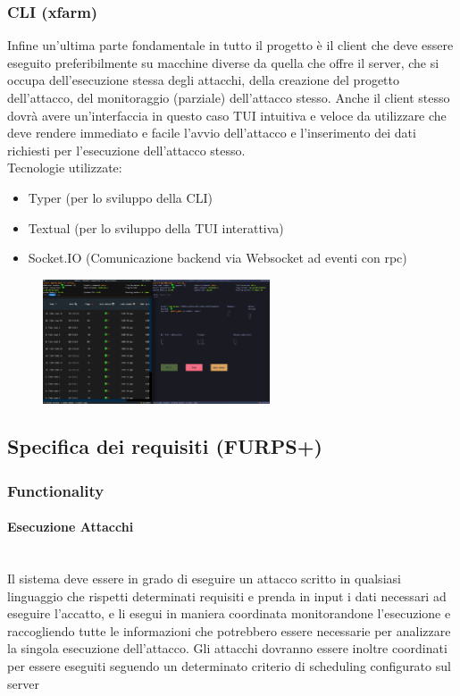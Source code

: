 \documentclass[11pt]{article}
\begin{document}
\subsubsection{CLI (xfarm)}
Infine un'ultima parte fondamentale in tutto il progetto è il client che deve essere eseguito preferibilmente su macchine diverse da quella che offre il server, che si occupa dell'esecuzione stessa degli attacchi, della creazione del progetto dell'attacco, del monitoraggio (parziale) dell'attacco stesso. Anche il client stesso dovrà avere un'interfaccia in questo caso TUI intuitiva e veloce da utilizzare che deve rendere immediato e facile l'avvio dell'attacco e l'inserimento dei dati richiesti per l'esecuzione dell'attacco stesso.
\\Tecnologie utilizzate:
	\begin{itemize}
		\item Typer (per lo sviluppo della CLI)
		\item Textual (per lo sviluppo della TUI interattiva)
		\item Socket.IO (Comunicazione backend via Websocket ad eventi con rpc)
	\end{itemize}
    \begin{figure}[H]
    	\centering
    	\includegraphics[width=0.6\textwidth]{xfarm-start-cmd.png}
	\end{figure}
\subsection{Specifica dei requisiti (FURPS+)}

\subsubsection{Functionality}
\paragraph{Esecuzione Attacchi}\mbox{}\\
Il sistema deve essere in grado di eseguire un attacco scritto in qualsiasi linguaggio che rispetti determinati requisiti e prenda in input i dati necessari ad eseguire l'accatto, e li esegui in maniera coordinata monitorandone l'esecuzione e raccogliendo tutte le informazioni che potrebbero essere necessarie per analizzare la singola esecuzione dell'attacco. Gli attacchi dovranno essere inoltre coordinati per essere eseguiti seguendo un determinato criterio di scheduling configurato sul server
\end{document}
